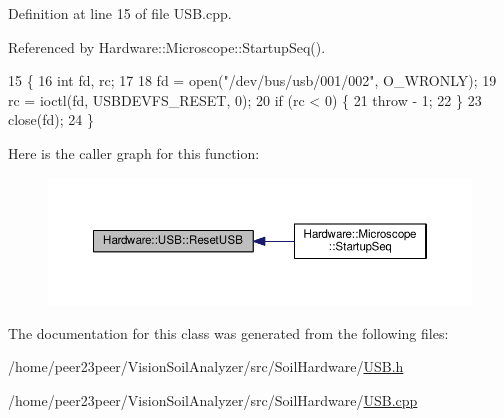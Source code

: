 Definition at line 15 of file U\+S\+B.\+cpp.



Referenced by Hardware\+::\+Microscope\+::\+Startup\+Seq().


\begin{DoxyCode}
15                    \{
16   \textcolor{keywordtype}{int} fd, rc;
17 
18   fd = open(\textcolor{stringliteral}{"/dev/bus/usb/001/002"}, O\_WRONLY);
19   rc = ioctl(fd, USBDEVFS\_RESET, 0);
20   \textcolor{keywordflow}{if} (rc < 0) \{
21     \textcolor{keywordflow}{throw} - 1;
22   \}
23   close(fd);
24 \}
\end{DoxyCode}


Here is the caller graph for this function\+:\nopagebreak
\begin{figure}[H]
\begin{center}
\leavevmode
\includegraphics[width=350pt]{class_hardware_1_1_u_s_b_af387867ec84f4c709b55e3605f9e313e_icgraph}
\end{center}
\end{figure}




The documentation for this class was generated from the following files\+:\begin{DoxyCompactItemize}
\item 
/home/peer23peer/\+Vision\+Soil\+Analyzer/src/\+Soil\+Hardware/\hyperlink{_u_s_b_8h}{U\+S\+B.\+h}\item 
/home/peer23peer/\+Vision\+Soil\+Analyzer/src/\+Soil\+Hardware/\hyperlink{_u_s_b_8cpp}{U\+S\+B.\+cpp}\end{DoxyCompactItemize}
